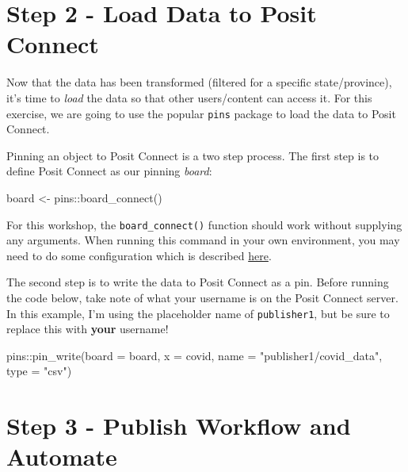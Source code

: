 \documentclass[
  letterpaper,
  DIV=11,
  numbers=noendperiod]{scrreprt}
\newenvironment{Shaded}{\begin{snugshade}}{\end{snugshade}}
\newcommand{\AttributeTok}[1]{\textcolor[rgb]{0.40,0.45,0.13}{#1}}
\newcommand{\FunctionTok}[1]{\textcolor[rgb]{0.28,0.35,0.67}{#1}}
\newcommand{\NormalTok}[1]{\textcolor[rgb]{0.00,0.23,0.31}{#1}}
\newcommand{\OtherTok}[1]{\textcolor[rgb]{0.00,0.23,0.31}{#1}}
\newcommand{\SpecialCharTok}[1]{\textcolor[rgb]{0.37,0.37,0.37}{#1}}
\newcommand{\StringTok}[1]{\textcolor[rgb]{0.13,0.47,0.30}{#1}}
\begin{document}
\section{Step 2 - Load Data to Posit
Connect}\label{step-2---load-data-to-posit-connect}

Now that the data has been transformed (filtered for a specific
state/province), it's time to \emph{load} the data so that other
users/content can access it. For this exercise, we are going to use the
popular \texttt{pins} package to load the data to Posit Connect.

Pinning an object to Posit Connect is a two step process. The first step
is to define Posit Connect as our pinning \emph{board}:

\begin{Shaded}
\begin{Highlighting}[]
\NormalTok{board }\OtherTok{\textless{}{-}}\NormalTok{ pins}\SpecialCharTok{::}\FunctionTok{board\_connect}\NormalTok{()}
\end{Highlighting}
\end{Shaded}

For this workshop, the \texttt{board\_connect()} function should work
without supplying any arguments. When running this command in your own
environment, you may need to do some configuration which is described
\href{https://pins.rstudio.com/reference/board_connect.html}{here}.

The second step is to write the data to Posit Connect as a pin. Before
running the code below, take note of what your username is on the Posit
Connect server. In this example, I'm using the placeholder name of
\texttt{publisher1}, but be sure to replace this with \textbf{your}
username!

\begin{Shaded}
\begin{Highlighting}[]
\NormalTok{pins}\SpecialCharTok{::}\FunctionTok{pin\_write}\NormalTok{(}\AttributeTok{board =}\NormalTok{ board, }\AttributeTok{x =}\NormalTok{ covid, }\AttributeTok{name =} \StringTok{"publisher1/covid\_data"}\NormalTok{, }\AttributeTok{type =} \StringTok{"csv"}\NormalTok{)}
\end{Highlighting}
\end{Shaded}

\section{Step 3 - Publish Workflow and
Automate}\label{step-3---publish-workflow-and-automate}
\end{document}
